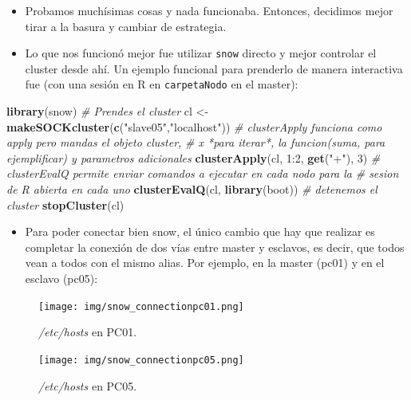 \documentclass[]{article}
\newenvironment{Shaded}{\begin{snugshade}}{\end{snugshade}}
\newcommand{\KeywordTok}[1]{\textcolor[rgb]{0.13,0.29,0.53}{\textbf{{#1}}}}
\newcommand{\DecValTok}[1]{\textcolor[rgb]{0.00,0.00,0.81}{{#1}}}
\newcommand{\StringTok}[1]{\textcolor[rgb]{0.31,0.60,0.02}{{#1}}}
\newcommand{\CommentTok}[1]{\textcolor[rgb]{0.56,0.35,0.01}{\textit{{#1}}}}
\newcommand{\NormalTok}[1]{{#1}}
\begin{document}
\begin{itemize}
\item
  Probamos muchísimas cosas y nada funcionaba. Entonces, decidimos mejor
  tirar a la basura y cambiar de estrategia.
\item
  Lo que nos funcionó mejor fue utilizar \texttt{snow} directo y mejor
  controlar el cluster desde ahí. Un ejemplo funcional para prenderlo de
  manera interactiva fue (con una sesión en R en \texttt{carpetaNodo} en
  el master):
\end{itemize}

\begin{Shaded}
\begin{Highlighting}[]
\KeywordTok{library}\NormalTok{(snow)}
\CommentTok{# Prendes el cluster}
\NormalTok{cl <-}\StringTok{ }\KeywordTok{makeSOCKcluster}\NormalTok{(}\KeywordTok{c}\NormalTok{(}\StringTok{"slave05"}\NormalTok{,}\StringTok{"localhost"}\NormalTok{))}
\CommentTok{# clusterApply funciona como apply pero mandas el objeto cluster, }
\CommentTok{# x *para iterar*, la funcion(suma, para ejemplificar) y parametros adicionales}
\KeywordTok{clusterApply}\NormalTok{(cl, }\DecValTok{1}\NormalTok{:}\DecValTok{2}\NormalTok{, }\KeywordTok{get}\NormalTok{(}\StringTok{"+"}\NormalTok{), }\DecValTok{3}\NormalTok{)}
\CommentTok{# clusterEvalQ permite enviar comandos a ejecutar en cada nodo para la }
\CommentTok{# sesion de R abierta en cada uno}
\KeywordTok{clusterEvalQ}\NormalTok{(cl, }\KeywordTok{library}\NormalTok{(boot))}
\CommentTok{# detenemos el cluster}
\KeywordTok{stopCluster}\NormalTok{(cl)}
\end{Highlighting}
\end{Shaded}

\begin{itemize}
\itemsep1pt\parskip0pt
\item
  Para poder conectar bien snow, el único cambio que hay que realizar es
  completar la conexión de dos vías entre master y esclavos, es decir,
  que todos vean a todos con el mismo alias. Por ejemplo, en la master
  (pc01) y en el esclavo (pc05):
\end{itemize}

\begin{figure}[H]
\centering
\texttt{[image: img/snow\_connectionpc01.png]}
\caption{\emph{/etc/hosts} en PC01.}

\end{figure}

\begin{figure}[H]
\centering
\texttt{[image: img/snow\_connectionpc05.png]}
\caption{\emph{/etc/hosts} en PC05.}

\end{figure}
\end{document}
